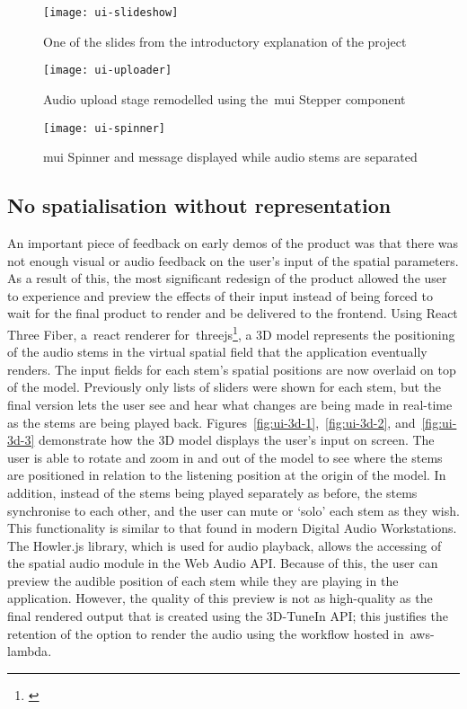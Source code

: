\begin{figure}[!htb]
    \minipage{\textwidth}
    \texttt{[image: ui-slideshow]}
    \caption{One of the slides from the introductory explanation of the project}\label{fig:ui-slideshow}
    \endminipage\hfill
\end{figure}

\begin{figure}[!htb]
    \minipage{\textwidth}
    \texttt{[image: ui-uploader]}
    \caption{Audio upload stage remodelled using the~\gls{mui} Stepper component}\label{fig:ui-uploader}
    \endminipage\hfill
\end{figure}

\begin{figure}[!htb]
    \minipage{\textwidth}
    \texttt{[image: ui-spinner]}
    \caption{\gls{mui} Spinner and message displayed while audio stems are separated}\label{fig:ui-spinner}
    \endminipage
\end{figure}

\subsection{No spatialisation without representation}\label{subsec:no-spatialisation-without-representation}
An important piece of feedback on early demos of the product was that there was not enough visual or audio feedback on the user's input of the spatial parameters.
As a result of this,
the most significant redesign of the product allowed the user
to experience and preview the effects of their input
instead of being forced to wait for the final product to render and be delivered to the frontend.
Using React Three Fiber, a~\gls{react} renderer for~\gls{threejs}\footnote{\citep{dirksen2023learn}},
a 3D model represents the positioning of the audio stems in the virtual spatial field
that the application eventually renders.
The input fields for each stem's spatial positions are now overlaid on top of the model.
Previously only lists of sliders were shown for each stem,
but the final version lets
the user see and hear what changes are being made in real-time as the stems are being played back.
Figures~\ref{fig:ui-3d-1},~\ref{fig:ui-3d-2},
and~\ref{fig:ui-3d-3} demonstrate how the 3D model displays the user's input on screen.
The user is able
to rotate and zoom in and out of the model
to see where the stems are positioned in relation to the listening position at the origin of the model.
In addition, instead of the stems being played separately as before, the stems synchronise to each other,
and the user can mute or `solo' each stem as they wish.
This functionality is similar to that found in modern Digital Audio Workstations.
The Howler.js library,
which is used for audio playback, allows the accessing of the spatial audio module in the Web Audio API\@.
Because of this, the user can preview the audible position of each stem while they are playing in the application.
However,
the quality of this preview is not as high-quality as the final rendered output that is created using the 3D-TuneIn API\@;
this justifies the retention of the option to render the audio using the workflow hosted in~\gls{aws-lambda}.

